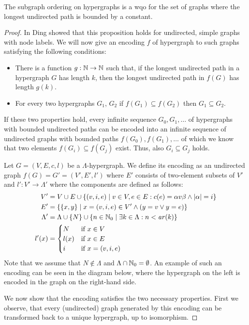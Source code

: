 \documentclass{llncs}
\newcommand{\subOrder}{\subseteq}
\newcommand{\arity}{\mathit{ar}}
\newcommand*{\graphDiagramScale}{0.75}
\begin{document}
{\begin{proposition}\label{prop:subgraph-wqo}
  The subgraph ordering on hypergraphs is a wqo for the
  set of graphs where the longest undirected path is bounded by a constant.
\end{proposition}

\begin{proof}
  In \cite{ding:subgraphs-wqo} Ding showed that this proposition holds
  for undirected, simple graphs with node labels. We will now give an
  encoding $f$ of hypergraph to such graphs satisfying the following
  conditions:
  \begin{itemize}
  \item There is a function $g : \mathbb{N} \to \mathbb{N}$ such that, if the longest 
  undirected path in a hypergraph $G$ has length $k$, then the longest 
  undirected path in $f(G)$ has length $g(k)$.
  \item For every two hypergraphs $G_1$, $G_2$ if $f(G_1) \subOrder f(G_2)$ 
    then $G_1 \subOrder G_2$.
  \end{itemize}
  If these two properties hold, every infinite sequence $G_0, G_1, \ldots$ of
  hypergraphs with bounded undirected paths can be encoded into an
  infinite sequence of undirected graphs with bounded paths $f(G_0), f(G_1),
  \ldots$ of which we know that two elements $f(G_i) \subOrder f(G_j)$
  exist. Thus, also $G_i \subOrder G_j$ holds.

  Let $G = (V, E, c, l)$ be a $\Lambda$-hypergraph. We define its
  encoding as an undirected graph $f(G) = G' = (V', E', l')$ where
  $E'$ consists of two-element subsets of $V'$ and $l' : V' \to
  \Lambda'$ where the components are defined as follows:
  \begin{align*}
    V' &= V \cup E \cup \{(v,i,e) \mid v \in V, e \in E: c(e) = \alpha v \beta 
    \land |\alpha| = i\}\\
    E' &= \{\{x,y\} \mid x = (v,i,e) \in V' \land (y = v \lor y = e)\}\\
    \Lambda' &= \Lambda \cup \{N\} \cup \{n \in \nat_0 \mid \exists k \in 
    \Lambda : n < \arity(k)\}\\
    l'(x) &= \begin{cases}
      N & \text{if } x \in V \\
      l(x) & \text{if } x \in E \\
      i & \text{if } x = (v,i,e)
    \end{cases}
  \end{align*}
  Note that we assume that $N \notin \Lambda $ and $\Lambda \cap
  \mathbb{N}_0 = \emptyset$.  An example of such an encoding can be seen in
  the diagram below, where the hypergraph on the left is encoded in
  the graph on the right-hand side.
  \begin{center}
    \img{\graphDiagramScale}{diagrams/subgraph-translation}
  \end{center}
  We now show that the encoding satisfies the two necessary
  properties.  First we observe, that every (undirected) graph
  generated by this encoding can be transformed back to a unique
  hypergraph, up to isomorphism.


\end{proof}}
\end{document}
